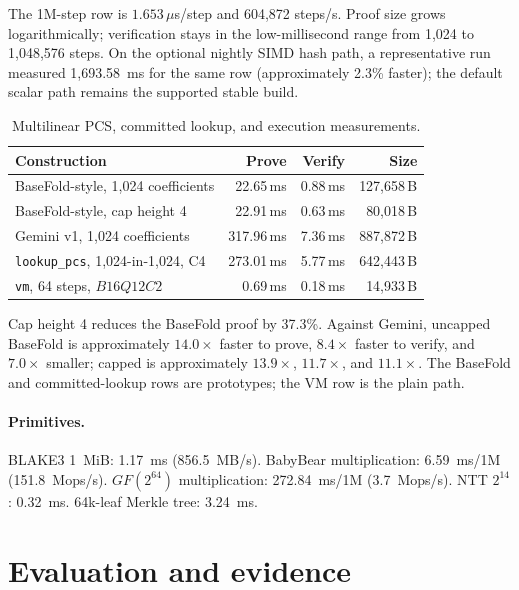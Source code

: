 \documentclass[11pt,a4paper]{article}
\begin{document}
The 1M-step row is $1.653\,\mu$s/step and 604,872 steps/s. Proof size grows
logarithmically; verification stays in the low-millisecond range from 1,024
to 1,048,576 steps. On the optional nightly SIMD hash path, a representative
run measured 1,693.58~ms for the same row (approximately 2.3\% faster); the
default scalar path remains the supported stable build.

\begin{table}[h]
\centering
\small
\begin{tabular}{@{}lrrr@{}}
\toprule
Construction & Prove & Verify & Size \\
\midrule
BaseFold-style, 1,024 coefficients & 22.65\,ms & 0.88\,ms & 127,658\,B \\
BaseFold-style, cap height 4 & 22.91\,ms & 0.63\,ms & 80,018\,B \\
Gemini v1, 1,024 coefficients & 317.96\,ms & 7.36\,ms & 887,872\,B \\
\texttt{lookup\_pcs}, 1,024-in-1,024, C4 & 273.01\,ms & 5.77\,ms & 642,443\,B \\
\texttt{vm}, 64 steps, $B16Q12C2$ & 0.69\,ms & 0.18\,ms & 14,933\,B \\
\bottomrule
\end{tabular}
\caption{Multilinear PCS, committed lookup, and execution measurements.}
\end{table}

Cap height 4 reduces the BaseFold proof by 37.3\%. Against Gemini, uncapped
BaseFold is approximately $14.0\times$ faster to prove, $8.4\times$ faster to
verify, and $7.0\times$ smaller; capped is approximately $13.9\times$,
$11.7\times$, and $11.1\times$. The BaseFold and committed-lookup rows are
prototypes; the VM row is the plain path.

\paragraph{Primitives.} BLAKE3 1~MiB: 1.17~ms (856.5~MB/s). BabyBear
multiplication: 6.59~ms/1M (151.8~Mops/s). $GF(2^{64})$ multiplication:
272.84~ms/1M (3.7~Mops/s). NTT $2^{14}$: 0.32~ms. 64k-leaf Merkle tree:
3.24~ms.

\section{Evaluation and evidence}
\end{document}
